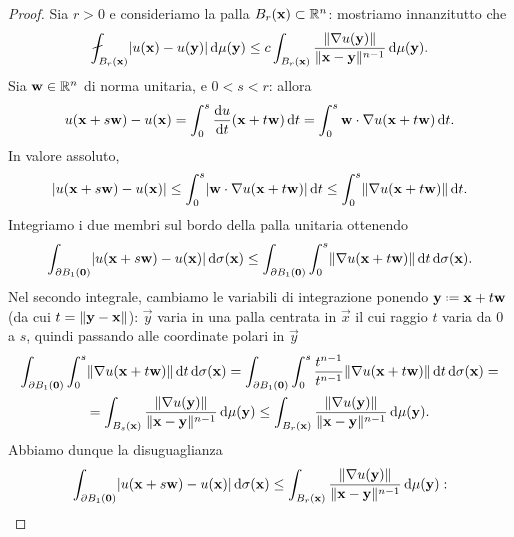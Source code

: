 \begin{proof}
    Sia $r>0$ e consideriamo la palla $B_r(\mathbf{x})\subset\mathbb{R}^n$: mostriamo innanzitutto che
    \begin{equation}
        \avint_{B_r(\vec x)}\abs{u(\vec x)-u(\vec y)}\,\dd\mu(\vec y)\le c\int_{B_r(\vec x)}\frac{\norm{\grad u(\vec y)}}{\norm{\vec x-\vec y}^{n-1}}\,\dd\mu(\vec y).
        \label{eq:dim-morrey-obiettivo}
    \end{equation}
    Sia $\mathbf{w}\in\mathbb{R}^n$ di norma unitaria, e $0<s<r$: allora
    \begin{equation}
        u(\mathbf{x}+s\mathbf{w})-u(\mathbf{x})=
        \int_0^s\frac{\textup{d} {u}}{\textup{d} {t}}(\mathbf{x}+t\mathbf{w})\,\textup{d} t=
        \int_0^s{\mathbf{w}}\cdot{\nabla u(\mathbf{x}+t\mathbf{w})}\,\textup{d} t.
    \end{equation}
    In valore assoluto,
    \begin{equation}
        \lvert u(\mathbf{x}+s\mathbf{w})-u(\mathbf{x})\rvert\le
        \int_0^s\lvert{\mathbf{w}}\cdot{\nabla u(\mathbf{x}+t\mathbf{w})}\rvert\,\textup{d} t\le
        \int_0^s\lVert\nabla u(\mathbf{x}+t\mathbf{w})\rVert\,\textup{d} t.
    \end{equation}
    Integriamo i due membri sul bordo della palla unitaria ottenendo
    \begin{equation}
        \int_{\partial B_1(\mathbf{0})} \lvert u(\mathbf{x}+s\mathbf{w})-u(\mathbf{x})\rvert\,\textup{d}\sigma(\mathbf{x})\le
        \int_{\partial B_1(\mathbf{0})}\int_0^s \lVert\nabla u(\mathbf{x}+t\mathbf{w})\rVert\,\textup{d} t\,\textup{d}\sigma(\mathbf{x}).
    \end{equation}
    Nel secondo integrale, cambiamo le variabili di integrazione ponendo $\vec y\defeq\vec x+t\vec w$ (da cui $t=\lVert\mathbf{y}-\mathbf{x}\rVert$): $\vec y$ varia in una palla centrata in $\vec x$ il cui raggio $t$ varia da $0$ a $s$, quindi passando alle coordinate polari in $\vec y$
    \begin{multline}
        \int_{\partial B_1(\mathbf{0})}\int_0^s \lVert\nabla u(\mathbf{x}+t\mathbf{w})\rVert\,\textup{d} t\,\textup{d}\sigma(\mathbf{x})=
        \int_{\partial B_1(\mathbf{0})}\int_0^s \frac{t^{n-1}}{t^{n-1}}\lVert\nabla u(\mathbf{x}+t\mathbf{w})\rVert\,\textup{d} t\,\textup{d}\sigma(\mathbf{x})=\\=
        \int_{B_s(\mathbf{x})} \frac{\lVert\nabla u(\mathbf{y})\rVert}{\lVert\mathbf{x}-\mathbf{y}\rVert^{n-1}}\,\textup{d}\mu(\mathbf{y})\le
        \int_{B_r(\mathbf{x})} \frac{\lVert\nabla u(\mathbf{y})\rVert}{\lVert\mathbf{x}-\mathbf{y}\rVert^{n-1}}\,\textup{d}\mu(\mathbf{y}).
    \end{multline}
    Abbiamo dunque la disuguaglianza 
    \begin{equation}
        \int_{\boundary B_1(\vec 0)} \abs{u(\vec x+s\vec w)-u(\vec x)}\,\dd\sigma(\vec x)\le
        \int_{B_r(\vec x)} \frac{\norm{\grad u(\vec y)}}{\norm{\vec x-\vec y}^{n-1}}\,\dd\mu(\vec y):

\end{equation}
\end{proof}
